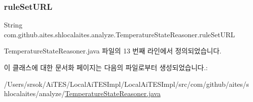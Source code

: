 \subsubsection{\texorpdfstring{rule\+Set\+U\+RL}{ruleSetURL}}
{\footnotesize\ttfamily String com.\+github.\+aites.\+shlocalaites.\+analyze.\+Temperature\+State\+Reasoner.\+rule\+Set\+U\+RL\hspace{0.3cm}{\ttfamily [private]}}



Temperature\+State\+Reasoner.\+java 파일의 13 번째 라인에서 정의되었습니다.



이 클래스에 대한 문서화 페이지는 다음의 파일로부터 생성되었습니다.\+:\begin{DoxyCompactItemize}
\item 
/\+Users/srsok/\+Ai\+T\+E\+S/\+Local\+Ai\+T\+E\+S\+Impl/\+Local\+Ai\+T\+E\+S\+Impl/src/com/github/aites/shlocalaites/analyze/\mbox{\hyperlink{_temperature_state_reasoner_8java}{Temperature\+State\+Reasoner.\+java}}\end{DoxyCompactItemize}
